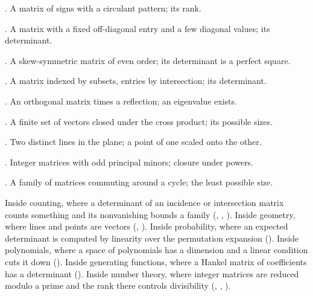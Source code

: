 \begin{ladder}
\item {}. A matrix of signs with a circulant pattern; its rank.
\item {}. A matrix with a fixed off-diagonal entry and a few diagonal values; its determinant.
\item {}. A skew-symmetric matrix of even order; its determinant is a perfect square.
\item {}. A matrix indexed by subsets, entries by intersection; its determinant.
\item {}. An orthogonal matrix times a reflection; an eigenvalue exists.
\item {}. A finite set of vectors closed under the cross product; its possible sizes.
\item {}. Two distinct lines in the plane; a point of one scaled onto the other.
\item {}. Integer matrices with odd principal minors; closure under powers.
\item {}. A family of matrices commuting around a cycle; the least possible size.
\end{ladder}

\begin{hides}
Inside counting, where a determinant of an incidence or intersection matrix counts something and its nonvanishing bounds a family (, , ). Inside geometry, where lines and points are vectors (, ). Inside probability, where an expected determinant is computed by linearity over the permutation expansion (). Inside polynomials, where a space of polynomials has a dimension and a linear condition cuts it down (). Inside generating functions, where a Hankel matrix of coefficients has a determinant (). Inside number theory, where integer matrices are reduced modulo a prime and the rank there controls divisibility (, , ).
\end{hides}
